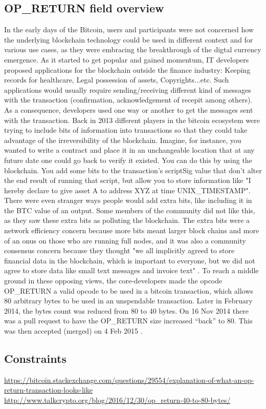 \documentclass[a4paper]{article}
\begin{document}
\subsection{OP\_RETURN field overview \cite{bit}}
In the early days of the Bitcoin, users and participants were not concerned how the underlying blockchain technology could be used in different context and for various use cases, as they were embracing the breakthrough of the digtal currency emergence. As it started to get popular and gained momentum, IT developers proposed applications for the blockchain outside the finance industry: Keeping records for healthcare, Legal possession of assets, Copyrights...etc. Such applications would usually require sending/receiving different kind of messages with the transaction (confirmation, acknowledgement of recepit among others). As a consequence, developers used one way or another to get the messages sent with the transaction. Back in 2013 different players in the bitcoin ecosystem were trying to include bits of information into transactions so that they could take advantage of the irreversibility of the blockchain. Imagine, for instance, you wanted to write a contract and place it in an unchangeable location that at any future date one could go back to verify it existed. You can do this by using the blockchain. You add some bits to the transaction's scriptSig value that don't alter the end result of running that script, but allow you to store information like "I hereby declare to give asset A to address XYZ at time UNIX\_TIMESTAMP". There were even stranger ways people would add extra bits, like including it in the BTC value of an output. Some members of the community did not like this, as they saw these extra bits as polluting the blockchain. The extra bits were a network efficiency concern because more bits meant larger block chains and more of an onus on those who are running full nodes, and it was also a community consensus concern because they thought "we all implicitly agreed to store financial data in the blockchain, which is important to everyone, but we did not agree to store data like small text messages and invoice text" . To reach a middle ground in these opposing views, the core-developers made the opcode OP\_RETURN a valid opcode to be used in a bitcoin transaction, which allows 80 arbitrary bytes to be used in an unspendable transaction. Later in February 2014, the bytes count was reduced from 80 to 40 bytes. On 16 Nov 2014 there was a pull request to have the OP\_RETURN size increased “back” to 80. This was then accepted (merged) on 4 Feb 2015 \cite{bit2}.
\subsection{Constraints}





\begin{thebibliography}{9}
\url{https://bitcoin.stackexchange.com/questions/29554/explanation-of-what-an-op-return-transaction-looks-like}
\url{http://www.talkcrypto.org/blog/2016/12/30/op_return-40-to-80-bytes/}
\end{thebibliography}
\end{document}

